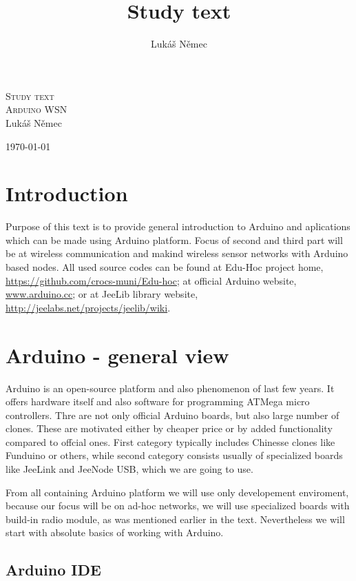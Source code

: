 \documentclass[12pt,titlepage]{article}
\title{Study text}
\author{Lukáš Němec}
\begin{document}
\begin{titlepage}
\begin{center}
\textsc{\LARGE Study text}\\[1cm]
\textsc{\Large Arduino WSN}\\[0.6cm]


\Large{Lukáš Němec}\\[1cm]

\bigskip
\bigskip

\Large{\today}
\end{center}
\end{titlepage}



\tableofcontents
\newpage
\section{Introduction}

Purpose of this text is to provide general introduction to Arduino and aplications which can be made using Arduino platform. Focus of second and third part will be at wireless communication and makind wireless sensor networks with Arduino based nodes. All used source codes can be found at Edu-Hoc project home, \url{https://github.com/crocs-muni/Edu-hoc}; at official Arduino website, \url{www.arduino.cc}; or at JeeLib library website, \url{http://jeelabs.net/projects/jeelib/wiki}.

\section{Arduino - general view}
Arduino is an open-source platform and also phenomenon of last few years. It offers hardware itself and also software for programming ATMega micro controllers. Thre are not only official Arduino boards, but also large number of clones. These are motivated either by cheaper price or by added functionality compared to offcial ones. First category  typically includes Chinesse clones like Funduino or others, while second category consists usually of specialized boards like JeeLink and JeeNode USB, which we are going to use.

From all containing Arduino platform we will use only developement enviroment, because our focus will be on ad-hoc networks, we will use specialized boards with build-in radio module, as was mentioned earlier in the text. Nevertheless we will start with absolute basics of working with Arduino.

	\subsection{Arduino IDE}
\end{document}
